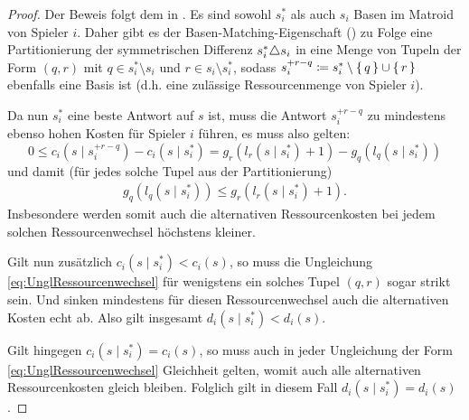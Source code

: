\begin{proof}
	Der Beweis folgt dem in \cite[Lemma 2.6]{BAPfadLaengeInAusl}. Es sind sowohl $s^\ast_i$ als auch $s_i$ Basen im Matroid von Spieler $i$. Daher gibt es der Basen-Matching-Eigenschaft () zu Folge eine Partitionierung der symmetrischen Differenz $s^\ast_i \triangle s_i$ in eine Menge von Tupeln der Form $(q,r)$ mit $q \in s^\ast_i\setminus s_i$ und $r \in s_i \setminus s^\ast_i$, sodass $s_i^{+r-q} \coloneqq s^\ast_i\setminus\set{q}\cup\set{r}$ ebenfalls eine Basis ist (d.h. eine zulässige Ressourcenmenge von Spieler $i$).
	
	Da nun $s^\ast_i$ eine beste Antwort auf $s$ ist, muss die Antwort $s_i^{+r-q}$ zu mindestens ebenso hohen Kosten für Spieler $i$ führen, es muss also gelten:
		\[0 \leq c_i(s \mid s_i^{+r-q}) - c_i(s \mid s^\ast_i) = g_r(l_r(s \mid s^\ast_i)+1) - g_q(l_q(s \mid s^\ast_i))\]
	und damit (für jedes solche Tupel aus der Partitionierung)
	\begin{align}\label{eq:UnglRessourcenwechsel}
		g_q(l_q(s \mid s^\ast_i)) \leq g_r(l_r(s \mid s^\ast_i)+1).
	\end{align}
	Insbesondere werden somit auch die alternativen Ressourcenkosten bei jedem solchen Ressourcenwechsel höchstens kleiner.
	
	Gilt nun zusätzlich $c_i(s \mid s^\ast_i) < c_i(s)$, so muss die Ungleichung \eqref{eq:UnglRessourcenwechsel} für wenigstens ein solches Tupel $(q,r)$ sogar strikt sein. Und sinken mindestens für diesen Ressourcenwechsel auch die alternativen Kosten echt ab. Also gilt insgesamt $d_i(s \mid s^\ast_i) < d_i(s)$.
	
	Gilt hingegen $c_i(s \mid s^\ast_i) = c_i(s)$, so muss auch in jeder Ungleichung der Form \eqref{eq:UnglRessourcenwechsel} Gleichheit gelten, womit auch alle alternativen Ressourcenkosten gleich bleiben. Folglich gilt in diesem Fall $d_i(s \mid s^\ast_i) = d_i(s)$.
\end{proof}

